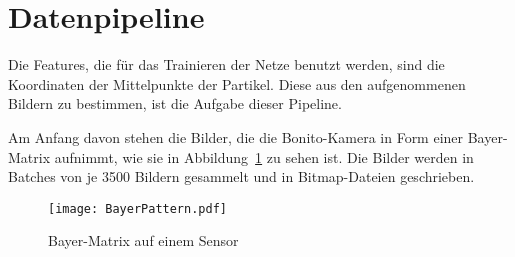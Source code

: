 \section{Datenpipeline} \label{sec:pipeline}


Die Features, die für das Trainieren der Netze benutzt werden, sind die Koordinaten der Mittelpunkte der Partikel.
Diese aus den aufgenommenen Bildern zu bestimmen, ist die Aufgabe dieser Pipeline.

Am Anfang davon stehen die Bilder, die die Bonito-Kamera in Form einer Bayer-Matrix aufnimmt, wie sie in Abbildung~\ref{fig:bayerPattern} zu sehen ist.
Die Bilder werden in Batches von je 3500 Bildern gesammelt und in Bitmap-Dateien geschrieben.

\begin{figure}[h]
	\centering
	\texttt{[image: BayerPattern.pdf]}
	\caption{Bayer-Matrix auf einem Sensor\cite{bayerPattern06}}
	\label{fig:bayerPattern}
\end{figure}

